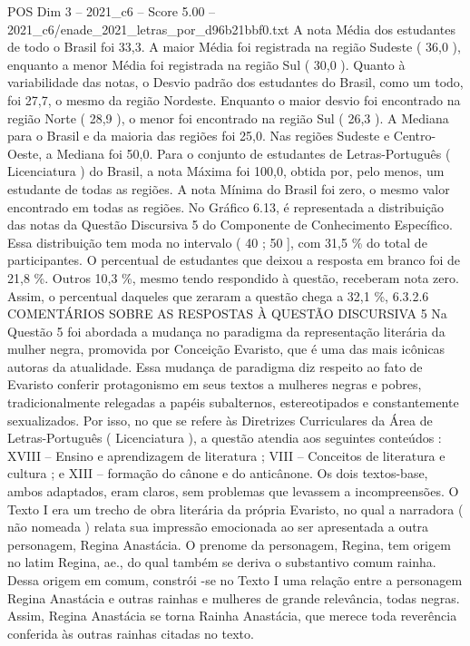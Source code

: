 \begin{textsample}{POS Dim 3 – 2021\_c6 – Score 5.00 – 2021\_c6/enade\_2021\_letras\_por\_d96b21bbf0.txt}
A nota Média dos estudantes de todo o Brasil foi 33,3.
A maior Média foi registrada na região Sudeste ( 36,0 ), enquanto a menor Média foi registrada na região Sul ( 30,0 ).
Quanto à variabilidade das notas, o Desvio padrão dos estudantes do Brasil, como um todo, foi 27,7, o mesmo da região Nordeste.
Enquanto o maior desvio foi encontrado na região Norte ( 28,9 ), o menor foi encontrado na região Sul ( 26,3 ).
A Mediana para o Brasil e da maioria das regiões foi 25,0.
Nas regiões Sudeste e Centro-Oeste, a Mediana foi 50,0.
Para o conjunto de estudantes de Letras-Português ( Licenciatura ) do Brasil, a nota Máxima foi 100,0, obtida por, pelo menos, um estudante de todas as regiões.
A nota Mínima do Brasil foi zero, o mesmo valor encontrado em todas as regiões.
No Gráfico 6.13, é representada a distribuição das notas da Questão Discursiva 5 do Componente de Conhecimento Específico.
Essa distribuição tem moda no intervalo ( 40 ; 50 ], com 31,5 \% do total de participantes.
O percentual de estudantes que deixou a resposta em branco foi de 21,8 \%.
Outros 10,3 \%, mesmo tendo respondido à questão, receberam nota zero.
Assim, o percentual daqueles que zeraram a questão chega a 32,1 \%, 6.3.2.6 COMENTÁRIOS SOBRE AS RESPOSTAS À QUESTÃO DISCURSIVA 5 Na Questão 5 foi abordada a mudança no paradigma da representação literária da mulher negra, promovida por Conceição Evaristo, que é uma das mais icônicas autoras da atualidade.
Essa mudança de paradigma diz respeito ao fato de Evaristo conferir protagonismo em seus textos a mulheres negras e pobres, tradicionalmente relegadas a papéis subalternos, estereotipados e constantemente sexualizados.
Por isso, no que se refere às Diretrizes Curriculares da Área de Letras-Português ( Licenciatura ), a questão atendia aos seguintes conteúdos : XVIII – Ensino e aprendizagem de literatura ; VIII – Conceitos de literatura e cultura ; e XIII – formação do cânone e do anticânone.
Os dois textos-base, ambos adaptados, eram claros, sem problemas que levassem a incompreensões.
O Texto I era um trecho de obra literária da própria Evaristo, no qual a narradora ( não nomeada ) relata sua impressão emocionada ao ser apresentada a outra personagem, Regina Anastácia.
O prenome da personagem, Regina, tem origem no latim Regina, ae., do qual também se deriva o substantivo comum rainha.
Dessa origem em comum, constrói -se no Texto I uma relação entre a personagem Regina Anastácia e outras rainhas e mulheres de grande relevância, todas negras.
Assim, Regina Anastácia se torna Rainha Anastácia, que merece toda reverência conferida às outras rainhas citadas no texto.

\end{textsample}
